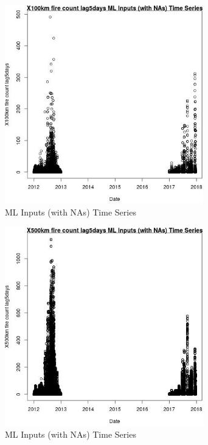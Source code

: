 \begin{figure} 
\centering  
\includegraphics[width=0.77\textwidth]{Code_Outputs/Report_ML_input_PM25_Step4_part_e_de_duplicated_aves_compiled_2019-05-14wNAs_X100km_fire_count_lag5daysvDate.jpg} 
\caption{\label{fig:Report_ML_input_PM25_Step4_part_e_de_duplicated_aves_compiled_2019-05-14wNAsX100km_fire_count_lag5daysvDate}ML Inputs (with NAs) Time Series} 
\end{figure} 
 

\begin{figure} 
\centering  
\includegraphics[width=0.77\textwidth]{Code_Outputs/Report_ML_input_PM25_Step4_part_e_de_duplicated_aves_compiled_2019-05-14wNAs_X500km_fire_count_lag5daysvDate.jpg} 
\caption{\label{fig:Report_ML_input_PM25_Step4_part_e_de_duplicated_aves_compiled_2019-05-14wNAsX500km_fire_count_lag5daysvDate}ML Inputs (with NAs) Time Series} 
\end{figure} 
 

